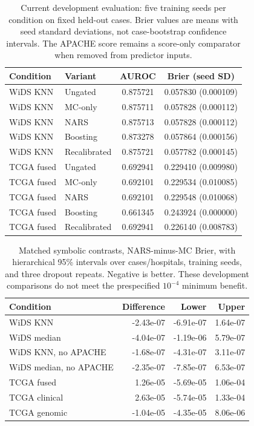 \begin{table}[t]
\caption{Current development evaluation: five training seeds per condition on fixed held-out cases. Brier values are means with seed standard deviations, not case-bootstrap confidence intervals. The APACHE score remains a score-only comparator when removed from predictor inputs.}
\label{tab:current_results}
\centering\scriptsize
\setlength{\tabcolsep}{4pt}
\begin{tabular}{@{}llcc@{}}
\toprule
Condition & Variant & AUROC & Brier (seed SD) \\
\midrule
WiDS KNN & Ungated & 0.875721 & 0.057830 (0.000109) \\
WiDS KNN & MC-only & 0.875711 & 0.057828 (0.000112) \\
WiDS KNN & NARS & 0.875713 & 0.057828 (0.000112) \\
WiDS KNN & Boosting & 0.873278 & 0.057864 (0.000156) \\
WiDS KNN & Recalibrated & 0.875721 & 0.057782 (0.000145) \\
TCGA fused & Ungated & 0.692941 & 0.229410 (0.009980) \\
TCGA fused & MC-only & 0.692101 & 0.229534 (0.010085) \\
TCGA fused & NARS & 0.692101 & 0.229548 (0.010068) \\
TCGA fused & Boosting & 0.661345 & 0.243924 (0.000000) \\
TCGA fused & Recalibrated & 0.692941 & 0.226140 (0.008783) \\
\bottomrule
\end{tabular}
\end{table}
\begin{table}[t]
\caption{Matched symbolic contrasts, NARS-minus-MC Brier, with hierarchical 95\% intervals over cases/hospitals, training seeds, and three dropout repeats. Negative is better. These development comparisons do not meet the prespecified $10^{-4}$ minimum benefit.}
\label{tab:current_symbolic}
\centering\scriptsize
\setlength{\tabcolsep}{3pt}
\begin{tabular}{@{}lrrr@{}}
\toprule
Condition & Difference & Lower & Upper \\
\midrule
WiDS KNN & -2.43e-07 & -6.91e-07 & 1.64e-07 \\
WiDS median & -4.04e-07 & -1.19e-06 & 5.79e-07 \\
WiDS KNN, no APACHE & -1.68e-07 & -4.31e-07 & 3.11e-07 \\
WiDS median, no APACHE & -2.35e-07 & -7.85e-07 & 6.53e-07 \\
TCGA fused & 1.26e-05 & -5.69e-05 & 1.06e-04 \\
TCGA clinical & 2.63e-05 & -5.74e-05 & 1.33e-04 \\
TCGA genomic & -1.04e-05 & -4.35e-05 & 8.06e-06 \\
\bottomrule
\end{tabular}
\end{table}

